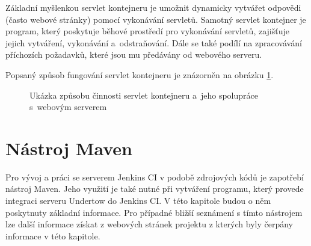             Základní myšlenkou servlet kontejneru je umožnit dynamicky vytvářet odpovědi (často webové stránky)
            pomocí vykonávání servletů. Samotný servlet kontejner je program, který poskytuje běhové prostředí pro vykonávání servletů,
            zajišťuje jejich vytváření, vykonávání a~odstraňování. Dále se také podílí na zpracovávání příchozích požadavků, které jsou
            mu předávány od webového serveru. 

            Popsaný způsob fungování servlet kontejneru je znázorněn na obrázku \ref{imgServlet}.
            \begin{figure}[ht]
                \begin{center}
                    \caption{Ukázka způsobu činnosti servlet kontejneru a~jeho spolupráce s~webovým serverem \cite{webserverVsServletPage}}
                    \label{imgServlet}
                \end{center}
            \end{figure}   %


         
    \section{Nástroj Maven} \label{maven}
        Pro vývoj a práci se serverem Jenkins CI v podobě zdrojových kódů je zapotřebí nástroj Maven. 
        Jeho využití je také nutné při vytváření programu, který provede integraci serveru Undertow do Jenkins CI. 
        V této kapitole budou o něm poskytnuty základní informace. Pro případné bližší
        seznámení s tímto nástrojem lze další informace získat z webových stránek projektu \cite{mavenWeb}
        z kterých byly čerpány informace v této kapitole. 
        
